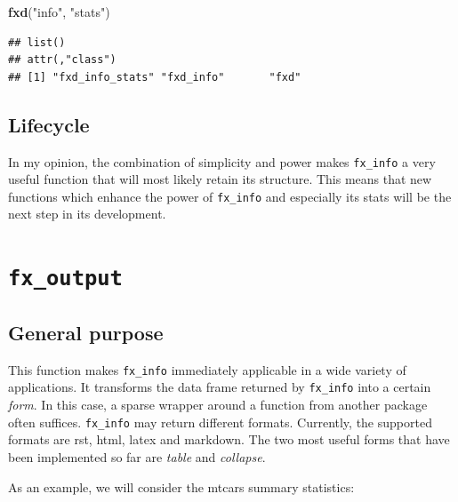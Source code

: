 \documentclass[]{report}
\newenvironment{Shaded}{\begin{snugshade}}{\end{snugshade}}
\newcommand{\KeywordTok}[1]{\textcolor[rgb]{0.13,0.29,0.53}{\textbf{#1}}}
\newcommand{\StringTok}[1]{\textcolor[rgb]{0.31,0.60,0.02}{#1}}
\newcommand{\NormalTok}[1]{#1}
\theoremstyle{definition}
\theoremstyle{definition}
\theoremstyle{definition}
\theoremstyle{remark}
\begin{document}
\begin{Shaded}
\begin{Highlighting}[]
\KeywordTok{fxd}\NormalTok{(}\StringTok{"info"}\NormalTok{, }\StringTok{"stats"}\NormalTok{)}
\end{Highlighting}
\end{Shaded}

\begin{verbatim}
## list()
## attr(,"class")
## [1] "fxd_info_stats" "fxd_info"       "fxd"
\end{verbatim}

\subsection{Lifecycle}\label{lifecycle-1}

In my opinion, the combination of simplicity and power makes
\texttt{fx\_info} a very useful function that will most likely retain
its structure. This means that new functions which enhance the power of
\texttt{fx\_info} and especially its stats will be the next step in its
development.

\section{\texorpdfstring{\texttt{fx\_output}}{fx\_output}}\label{fx_output}

\subsection{General purpose}\label{general-purpose-2}

This function makes \texttt{fx\_info} immediately applicable in a wide
variety of applications. It transforms the data frame returned by
\texttt{fx\_info} into a certain \emph{form}. In this case, a sparse
wrapper around a function from another package often suffices.
\texttt{fx\_info} may return different formats. Currently, the supported
formats are rst, html, latex and markdown. The two most useful forms
that have been implemented so far are \emph{table} and \emph{collapse}.

As an example, we will consider the mtcars summary statistics:
\end{document}
